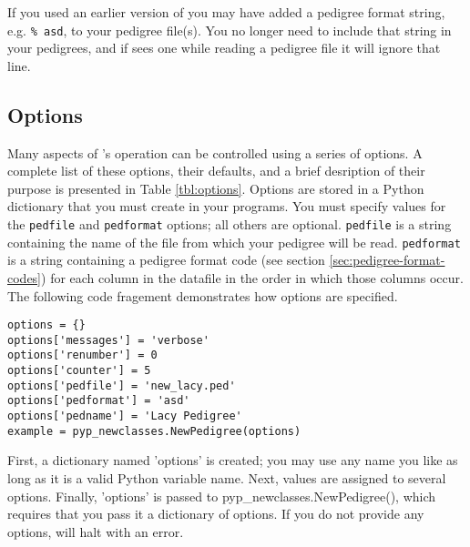 If you used an earlier version of \PyPedal{} you may have added a pedigree format string, e.g. \texttt{\% asd}, to your pedigree file(s).  You no longer need to include that string in your pedigrees, and if \PyPedal{} sees one while reading a pedigree file it will ignore that line.
\subsection{Options}
\label{sec:pypedal-options}
Many aspects of \PyPedal{}'s operation can be controlled using a series of options.  A complete list of these options, their defaults, and a brief desription of their purpose is presented in Table \ref{tbl:options}.  Options are stored in a Python dictionary that you must create in your programs.  You must specify values for the \texttt{pedfile} and \texttt{pedformat} options; all others are optional.  \texttt{pedfile} is a string containing the name of the file from which your pedigree will be read.  \texttt{pedformat} is a string containing a pedigree format code (see section \ref{sec:pedigree-format-codes}) for each column in the datafile in the order in which those columns occur.  The following code fragement demonstrates how options are specified.
\begin{verbatim}
options = {}
options['messages'] = 'verbose'
options['renumber'] = 0
options['counter'] = 5
options['pedfile'] = 'new_lacy.ped'
options['pedformat'] = 'asd'
options['pedname'] = 'Lacy Pedigree'
example = pyp_newclasses.NewPedigree(options)
\end{verbatim}
First, a dictionary named 'options' is created; you may use any name you like as long as it is a valid Python variable name.  Next, values are assigned to several options.  Finally, 'options' is passed to pyp_newclasses.NewPedigree(), which requires that you pass it a dictionary of options.  If you do not provide any options, \PyPedal{} will halt with an error.
